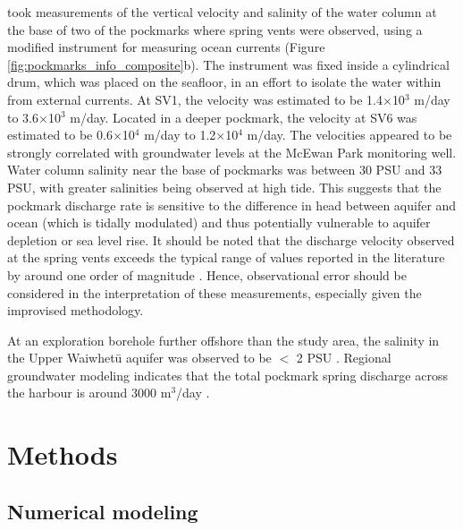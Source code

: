 \documentclass[pdflatex,sn-apa]{sn-jnl}%
\begin{document}
\cite{harding_characteristics_2000} took measurements of the vertical velocity and salinity of the water column at the base of two of the pockmarks where spring vents were observed,
using a modified instrument for measuring ocean currents (Figure \ref{fig:pockmarks_info_composite}b).
The instrument was fixed inside a cylindrical drum, which was placed on the seafloor, in an effort to isolate the water within from external currents.
At SV1, the velocity was estimated to be 1.4$\times$10$^3$ m/day to 3.6$\times$10$^3$ m/day. Located in a deeper pockmark, the velocity at SV6 was estimated to be 0.6$\times$10$^4$ m/day to 1.2$\times$10$^4$ m/day.
The velocities appeared to be strongly correlated with groundwater levels at the McEwan Park monitoring well.
Water column salinity near the base of pockmarks was between 30 PSU and 33 PSU, with greater salinities being observed at high tide.
This suggests that the pockmark discharge rate is sensitive to the difference in head between aquifer and ocean (which is tidally modulated) and thus potentially vulnerable to aquifer depletion or sea level rise.
It should be noted that the discharge velocity observed at the spring vents exceeds the typical range of values reported in the literature by around one order of magnitude \citep{diego-feliu_combining_2025}.
Hence, observational error should be considered in the interpretation of these measurements, especially given the improvised methodology.

At an exploration borehole further offshore than the study area, the salinity in the Upper Waiwhetū aquifer was observed to be $<$ 2 PSU \citep{gyopari_wellington_2018}.
Regional groundwater modeling indicates that the total pockmark spring discharge across the harbour is around 3000 m$^3$/day \citep{bennett_hutt_2024}.

\section{Methods}\label{methods}

\subsection{Numerical modeling}
\end{document}
